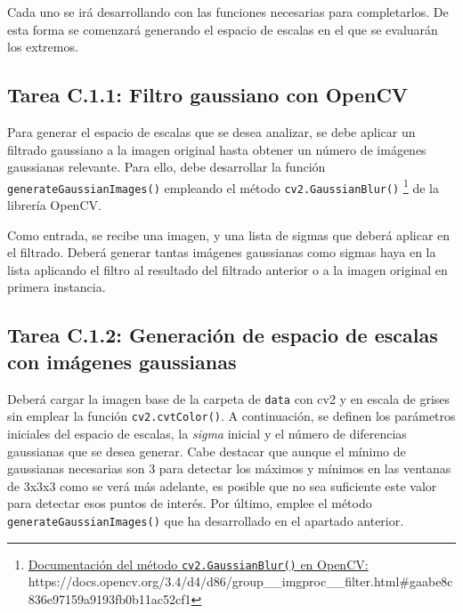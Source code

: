Cada uno se irá desarrollando con las funciones necesarias para completarlos. De esta forma se comenzará generando el espacio de escalas en el que se evaluarán los extremos.

\subsection*{Tarea C.1.1: Filtro gaussiano con OpenCV}
{}

Para generar el espacio de escalas que se desea analizar, se debe aplicar un filtrado gaussiano a la imagen original hasta obtener un número de imágenes gaussianas relevante. Para ello, debe desarrollar la función \texttt{generateGaussianImages()} empleando el método \texttt{cv2.GaussianBlur()} \footnote{ \href{https://docs.opencv.org/3.4/d4/d86/group\_\_imgproc\_\_filter.html\#gaabe8c836e97159a9193fb0b11ac52cf1}{Documentación del método \texttt{cv2.GaussianBlur()} en OpenCV:} \\{https://docs.opencv.org/3.4/d4/d86/group\_\_imgproc\_\_filter.html\#gaabe8c836e97159a9193fb0b11ac52cf1}} de la librería OpenCV.


Como entrada, se recibe una imagen, y una lista de sigmas que deberá aplicar en el filtrado. Deberá generar tantas imágenes gaussianas como sigmas haya en la lista aplicando el filtro al resultado del filtrado anterior o a la imagen original en primera instancia.

\subsection*{Tarea C.1.2: Generación de espacio de escalas con imágenes gaussianas}

Deberá cargar la imagen base de la carpeta de \texttt{data} con cv2 y en escala de grises sin emplear la función \texttt{cv2.cvtColor()}. A continuación, se definen los parámetros iniciales del espacio de escalas, la \textit{sigma} inicial y el número de diferencias gaussianas que se desea generar. Cabe destacar que aunque el mínimo de gaussianas necesarias son 3 para detectar los máximos y mínimos en las ventanas de 3x3x3 como se verá más adelante, es posible que no sea suficiente este valor para detectar esos puntos de interés. Por último, emplee el método \texttt{generateGaussianImages()} que ha desarrollado en el apartado anterior.

